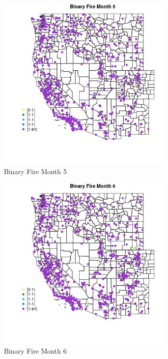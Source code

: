 \begin{figure} 
\centering  
\includegraphics[width=0.77\textwidth]{Code_Outputs/Report_ML_input_PM25_Step4_part_f_de_duplicated_aves_prioritize_24hr_obswNAs_MapObsMo5Binary_Fire.jpg} 
\caption{\label{fig:Report_ML_input_PM25_Step4_part_f_de_duplicated_aves_prioritize_24hr_obswNAsMapObsMo5Binary_Fire}Binary Fire Month 5} 
\end{figure} 
 

\begin{figure} 
\centering  
\includegraphics[width=0.77\textwidth]{Code_Outputs/Report_ML_input_PM25_Step4_part_f_de_duplicated_aves_prioritize_24hr_obswNAs_MapObsMo6Binary_Fire.jpg} 
\caption{\label{fig:Report_ML_input_PM25_Step4_part_f_de_duplicated_aves_prioritize_24hr_obswNAsMapObsMo6Binary_Fire}Binary Fire Month 6} 
\end{figure} 
 

